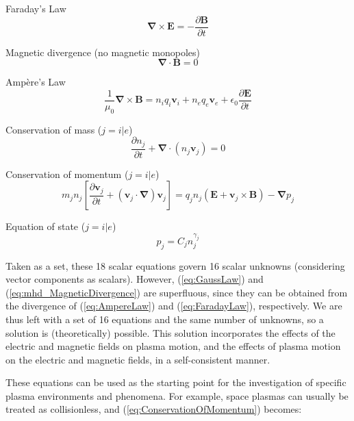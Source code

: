 \documentclass{article}
\begin{document}
Faraday's Law
\begin{equation}
    \mathbf \nabla \times \mathbf E = -\frac {\partial \mathbf B} {\partial t}
    \label{eq:FaradayLaw}
\end{equation}

Magnetic divergence (no magnetic monopoles)
\begin{equation}
  \mathbf \nabla \cdotp \mathbf B = 0
  \label{eq:mhd_MagneticDivergence}
\end{equation}

Amp\`{e}re's Law
\begin{equation}
    \frac {1} {\mu_0} \mathbf \nabla \times \mathbf B = n_i q_i \mathbf v_i + n_e q_e \mathbf v_e + \epsilon_0 \frac {\partial \mathbf E} {\partial t}
    \label{eq:AmpereLaw}
\end{equation}

Conservation of mass ($j = i|e$)
\begin{equation}
    \frac {\partial n_j} {\partial t} + \mathbf \nabla \cdotp \left(n_j \mathbf v_j \right) = 0
    \label{eq:ConservationOfMass}
\end{equation}

Conservation of momentum ($j = i|e$)
\begin{equation}
  m_j n_j \left[ \frac {\partial \mathbf v_j} {\partial t} + \left( \mathbf v_j \cdotp \mathbf \nabla \right) \mathbf v_j \right] = q_j n_j \left(\mathbf E + \mathbf v_j \times \mathbf B \right) - \mathbf \nabla p_j
  \label{eq:ConservationOfMomentum}
\end{equation}

Equation of state ($j = i|e$)
\begin{equation}
    p_j = C_j n_j^{\gamma_j}
    \label{eq:EquationOfState}
\end{equation}

Taken as a set, these 18 scalar equations govern 16 scalar unknowns (considering vector components as scalars). However, (\ref{eq:GaussLaw}) and (\ref{eq:mhd_MagneticDivergence}) are superfluous, since they can be obtained from the divergence of (\ref{eq:AmpereLaw}) and (\ref{eq:FaradayLaw}), respectively. We are thus left with a set of 16 equations and the same number of unknowns, so a solution is (theoretically) possible. This solution incorporates the effects of the electric and magnetic fields on plasma motion, and the effects of plasma motion on the electric and magnetic fields, in a self-consistent manner.

These equations can be used as the starting point for the investigation of specific plasma environments and phenomena. For example, space plasmas can usually be treated as collisionless, and (\ref{eq:ConservationOfMomentum}) becomes:
\end{document}
